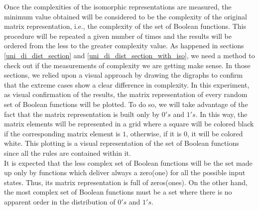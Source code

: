 Once the complexities of the isomorphic representations are measured, the minimum value obtained will be considered to be the complexity of the original matrix representation, i.e., the complexity of the set of Boolean functions. This procedure will be repeated a given number of times and the results will be ordered from the less to the greater complexity value. As happened in sections \ref{uni_di_dist_section} and \ref{uni_di_dist_section_with_iso}, we need a method to check out if the measurements of complexity we are getting make sense. In those sections, we relied upon a visual approach by drawing the digraphs to confirm that the extreme cases show a clear difference in complexity. In this experiment, as visual confirmation of the results, the matrix representation of every random set of Boolean functions will be plotted. To do so, we will take advantage of the fact that the matrix representation is built only by $0's$ and $1's$. In this way, the matrix elements will be represented in a grid where a square will be colored black if the corresponding matrix element is $1$, otherwise, if it is $0$, it will be colored white. This plotting is a visual representation of the set of Boolean functions since all the rules are contained within it.\\

It is expected that the less complex set of Boolean functions will be the set made up only by functions which deliver always a zero(one) for all the possible input states. Thus, its matrix representation is full of zeros(ones). On the other hand, the most complex set of Boolean functions must be a set where there is no apparent order in the distribution of $0's$ and $1's$.\\

